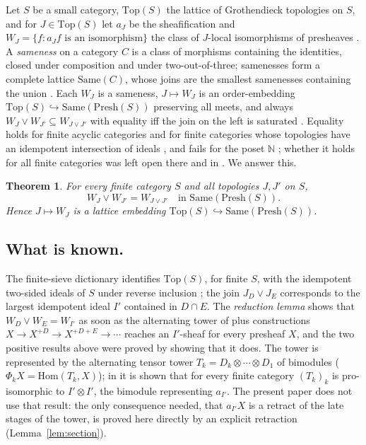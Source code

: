 \documentclass[11pt]{amsart}
\newtheorem{thm}{Theorem}[section]
\theoremstyle{definition}
\newcommand{\Same}{\mathrm{Same}}
\newcommand{\Top}{\mathrm{Top}}
\newcommand{\Presh}{\mathrm{Presh}}
\newcommand{\Hom}{\mathrm{Hom}}
\begin{document}
Let $S$ be a small category, $\Top(S)$ the lattice of Grothendieck topologies
on $S$, and for $J\in\Top(S)$ let $a_J$ be the sheafification and
$W_J=\{f:a_Jf\text{ is an isomorphism}\}$ the class of $J$-local isomorphisms
of presheaves \cite[III.7]{MLM}. A \emph{sameness} on a category $C$ is a
class of morphisms containing the identities, closed under composition and
under two-out-of-three; samenesses form a complete lattice $\Same(C)$, whose
joins are the smallest samenesses containing the union \cite{Same}. Each
$W_J$ is a sameness, $J\mapsto W_J$ is an order-embedding
$\Top(S)\hookrightarrow\Same(\Presh(S))$ preserving all meets, and always
$W_J\vee W_{J'}\subseteq W_{J\vee J'}$ with equality iff the join on the left
is saturated \cite[Thms.~3.1, 4.2]{Topjoin}. Equality holds for finite acyclic
categories and for finite categories whose topologies have an idempotent
intersection of ideals \cite[Thms.~5.1, 6.10]{Topjoin}, and fails for the
poset $\mathbb N$ \cite[Thm.~7.1]{Topjoin}; whether it holds for all finite
categories was left open there and in \cite[Question~6.8]{Integrated}. We
answer this.

\begin{thm}\label{thm:main}
For every finite category $S$ and all topologies $J,J'$ on $S$,
\[
W_J\vee W_{J'}=W_{J\vee J'}\quad\text{in }\Same(\Presh(S)).
\]
Hence $J\mapsto W_J$ is a lattice embedding $\Top(S)\hookrightarrow\Same(\Presh(S))$.
\end{thm}

\subsection*{What is known.}
The finite-sieve dictionary identifies $\Top(S)$, for finite $S$, with the
idempotent two-sided ideals of $S$ under reverse inclusion
\cite[Thm.~5.1]{Postnikov}; the join $J_D\vee J_E$ corresponds to the largest
idempotent ideal $I'$ contained in $D\cap E$. The \emph{reduction lemma}
\cite[Lemma~4.3]{Topjoin} shows that $W_D\vee W_E=W_{I'}$ as soon as the
alternating tower of plus constructions $X\to X^{+D}\to X^{+D+E}\to\cdots$
reaches an $I'$-sheaf for every presheaf $X$, and the two positive results
above were proved by showing that it does. The tower is represented by the
alternating tensor tower $T_k=D_k\otimes\cdots\otimes D_1$ of bimodules
($\Phi_kX=\Hom(T_k,X)$); in \cite[\S6.3]{Integrated} it is shown that for
every finite category $(T_k)_k$ is pro-isomorphic to $I'\otimes I'$, the
bimodule representing $a_{I'}$. The present paper does not use that result:
the only consequence needed, that $a_{I'}X$ is a retract of the late stages of
the tower, is proved here directly by an explicit retraction
(Lemma~\ref{lem:section}).
\end{document}

